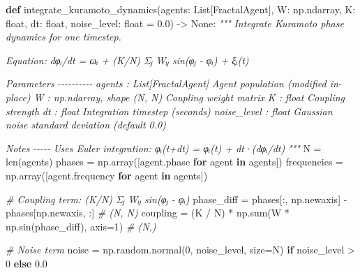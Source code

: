 \documentclass[
]{article}
\newenvironment{Shaded}{}{}
\newcommand{\BuiltInTok}[1]{\textcolor[rgb]{0.00,0.50,0.00}{#1}}
\newcommand{\CommentTok}[1]{\textcolor[rgb]{0.38,0.63,0.69}{\textit{#1}}}
\newcommand{\ControlFlowTok}[1]{\textcolor[rgb]{0.00,0.44,0.13}{\textbf{#1}}}
\newcommand{\DecValTok}[1]{\textcolor[rgb]{0.25,0.63,0.44}{#1}}
\newcommand{\FloatTok}[1]{\textcolor[rgb]{0.25,0.63,0.44}{#1}}
\newcommand{\KeywordTok}[1]{\textcolor[rgb]{0.00,0.44,0.13}{\textbf{#1}}}
\newcommand{\NormalTok}[1]{#1}
\newcommand{\OperatorTok}[1]{\textcolor[rgb]{0.40,0.40,0.40}{#1}}
\newcommand{\VariableTok}[1]{\textcolor[rgb]{0.10,0.09,0.49}{#1}}
\begin{document}
\begin{Shaded}
\begin{Highlighting}[]
\KeywordTok{def}\NormalTok{ integrate\_kuramoto\_dynamics(agents: List[FractalAgent],}
\NormalTok{                               W: np.ndarray,}
\NormalTok{                               K: }\BuiltInTok{float}\NormalTok{,}
\NormalTok{                               dt: }\BuiltInTok{float}\NormalTok{,}
\NormalTok{                               noise\_level: }\BuiltInTok{float} \OperatorTok{=} \FloatTok{0.0}\NormalTok{) }\OperatorTok{{-}\textgreater{}} \VariableTok{None}\NormalTok{:}
    \CommentTok{"""}
\CommentTok{    Integrate Kuramoto phase dynamics for one timestep.}

\CommentTok{    Equation:}
\CommentTok{        dφᵢ/dt = ωᵢ + (K/N) Σⱼ Wᵢⱼ sin(φⱼ {-} φᵢ) + ξᵢ(t)}

\CommentTok{    Parameters}
\CommentTok{    {-}{-}{-}{-}{-}{-}{-}{-}{-}{-}}
\CommentTok{    agents : List[FractalAgent]}
\CommentTok{        Agent population (modified in{-}place)}
\CommentTok{    W : np.ndarray, shape (N, N)}
\CommentTok{        Coupling weight matrix}
\CommentTok{    K : float}
\CommentTok{        Coupling strength}
\CommentTok{    dt : float}
\CommentTok{        Integration timestep (seconds)}
\CommentTok{    noise\_level : float}
\CommentTok{        Gaussian noise standard deviation (default 0.0)}

\CommentTok{    Notes}
\CommentTok{    {-}{-}{-}{-}{-}}
\CommentTok{    Uses Euler integration: φᵢ(t+dt) = φᵢ(t) + dt·(dφᵢ/dt)}
\CommentTok{    """}
\NormalTok{    N }\OperatorTok{=} \BuiltInTok{len}\NormalTok{(agents)}
\NormalTok{    phases }\OperatorTok{=}\NormalTok{ np.array([agent.phase }\ControlFlowTok{for}\NormalTok{ agent }\KeywordTok{in}\NormalTok{ agents])}
\NormalTok{    frequencies }\OperatorTok{=}\NormalTok{ np.array([agent.frequency }\ControlFlowTok{for}\NormalTok{ agent }\KeywordTok{in}\NormalTok{ agents])}

    \CommentTok{\# Coupling term: (K/N) Σⱼ Wᵢⱼ sin(φⱼ {-} φᵢ)}
\NormalTok{    phase\_diff }\OperatorTok{=}\NormalTok{ phases[:, np.newaxis] }\OperatorTok{{-}}\NormalTok{ phases[np.newaxis, :]  }\CommentTok{\# (N, N)}
\NormalTok{    coupling }\OperatorTok{=}\NormalTok{ (K }\OperatorTok{/}\NormalTok{ N) }\OperatorTok{*}\NormalTok{ np.}\BuiltInTok{sum}\NormalTok{(W }\OperatorTok{*}\NormalTok{ np.sin(phase\_diff), axis}\OperatorTok{=}\DecValTok{1}\NormalTok{)  }\CommentTok{\# (N,)}

    \CommentTok{\# Noise term}
\NormalTok{    noise }\OperatorTok{=}\NormalTok{ np.random.normal(}\DecValTok{0}\NormalTok{, noise\_level, size}\OperatorTok{=}\NormalTok{N) }\ControlFlowTok{if}\NormalTok{ noise\_level }\OperatorTok{\textgreater{}} \DecValTok{0} \ControlFlowTok{else} \FloatTok{0.0}


\end{Highlighting}
\end{Shaded}
\end{document}
